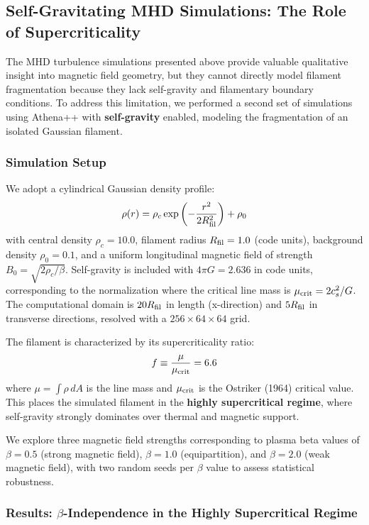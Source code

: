 \documentclass[11pt,a4paper]{article}
\begin{document}
\subsection{Self-Gravitating MHD Simulations: The Role of Supercriticality}

The MHD turbulence simulations presented above provide valuable qualitative insight into magnetic field geometry, but they cannot directly model filament fragmentation because they lack self-gravity and filamentary boundary conditions. To address this limitation, we performed a second set of simulations using Athena++ with \textbf{self-gravity} enabled, modeling the fragmentation of an isolated Gaussian filament.

\subsubsection{Simulation Setup}

We adopt a cylindrical Gaussian density profile:
\begin{equation}
\rho(r) = \rho_c \exp\left(-\frac{r^2}{2 R_{\rm fil}^2}\right) + \rho_0
\end{equation}
with central density $\rho_c = 10.0$, filament radius $R_{\rm fil} = 1.0$ (code units), background density $\rho_0 = 0.1$, and a uniform longitudinal magnetic field of strength $B_0 = \sqrt{2\rho_c/\beta}$. Self-gravity is included with $4\pi G = 2.636$ in code units, corresponding to the normalization where the critical line mass is $\mu_{\rm crit} = 2c_s^2/G$. The computational domain is $20 R_{\rm fil}$ in length (x-direction) and $5 R_{\rm fil}$ in transverse directions, resolved with a $256 \times 64 \times 64$ grid.

The filament is characterized by its supercriticality ratio:
\begin{equation}
f \equiv \frac{\mu}{\mu_{\rm crit}} = 6.6
\end{equation}
where $\mu = \int \rho \, dA$ is the line mass and $\mu_{\rm crit}$ is the Ostriker (1964) critical value. This places the simulated filament in the \textbf{highly supercritical regime}, where self-gravity strongly dominates over thermal and magnetic support.

We explore three magnetic field strengths corresponding to plasma beta values of $\beta = 0.5$ (strong magnetic field), $\beta = 1.0$ (equipartition), and $\beta = 2.0$ (weak magnetic field), with two random seeds per $\beta$ value to assess statistical robustness.

\subsubsection{Results: $\beta$-Independence in the Highly Supercritical Regime}
\end{document}
